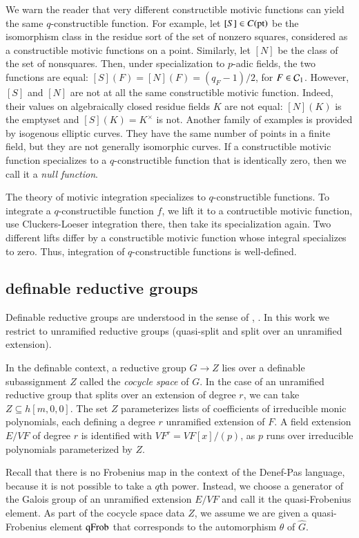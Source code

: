 We warn the reader that very different constructible motivic functions
can yield the same $q$-constructible function.  For example, let
$[S]\in C({\operatorname{pt}})$ be the isomorphism class in the residue sort of
the set of nonzero squares, considered as a constructible motivic
functions on a point.  Similarly, let $[N]$ be the class of the set of
nonsquares.  Then, under specialization to $p$-adic fields, the two
functions are equal: $[S](F) = [N](F) = (q_F-1)/2$, for
$F\in\mathcal C_1$. However, $[S]$ and $[N]$ are not at all the same
constructible motivic function. Indeed, their values on algebraically
closed residue fields $K$ are not equal: $[N](K)$ is the emptyset and
$[S](K) = K^\times$ is not.  Another family of examples is provided by
isogenous elliptic curves.  They have the same number of points in a
finite field, but they are not generally isomorphic curves.  If a
constructible motivic function specializes to a $q$-constructible
function that is identically zero, then we call it a {\it null function}.

The theory of motivic integration specializes to $q$-constructible
functions. To integrate a $q$-constructible function $f$, we lift it
to a contructible motivic function, use Cluckers-Loeser integration
there, then take its specialization again.  Two different lifts differ
by a constructible motivic function whose integral specializes to
zero. Thus, integration of $q$-constructible functions is well-defined.

\subsection{definable reductive groups}

Definable reductive groups are understood in the sense of
\cite{cluckers2011transfer}, \cite{gordon}.  In this work we restrict
to unramified reductive groups (quasi-split and split over an
unramified extension).

In the definable context, a reductive group $G\to Z$ lies over a
definable subassignment $Z$ called the {\it cocycle space} of $G$.  In
the case of an unramified reductive group that splits over an
extension of degree $r$, we can take $Z\subseteq h[m,0,0]$.  The set
$Z$ parameterizes lists of coefficients of irreducible monic
polynomials, each defining a degree $r$ unramified extension of $F$.
A field extension $E/VF$ of degree $r$ is identified with $VF^r =
VF[x]/(p)$, as $p$ runs over irreducible polynomials parameterized by
$Z$.

Recall that there is no Frobenius map in the context of the Denef-Pas
language, because it is not possible to take a $q$th power.  Instead,
we choose a generator of the Galois group of an unramified extension
$E/VF$ and call it the quasi-Frobenius element.  As part of the
cocycle space data $Z$, we assume we are given a quasi-Frobenius
element ${\operatorname{qFrob}}$ that corresponds to the automorphism $\theta$ of
$\hat G$.

